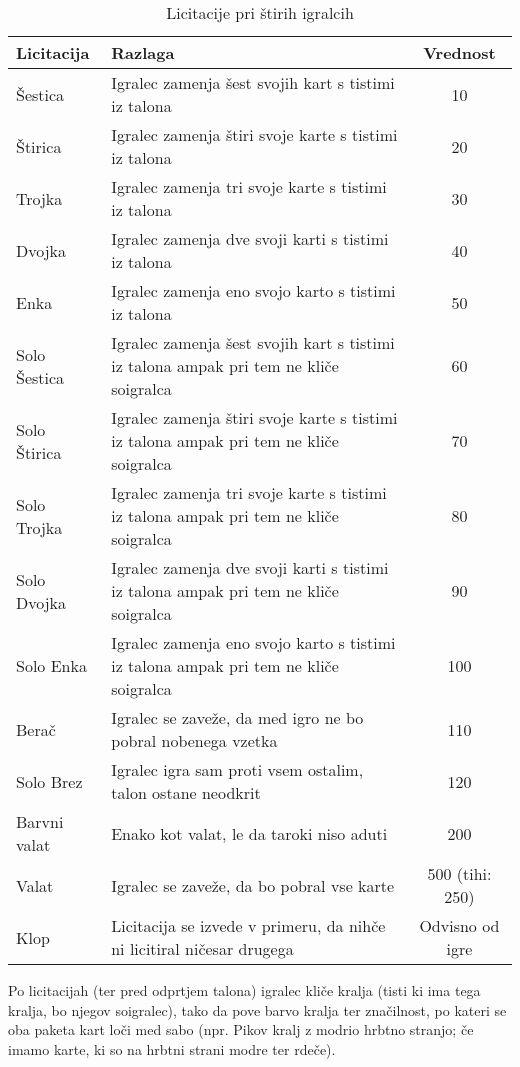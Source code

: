 \documentclass[a4paper, ]{report}
\begin{document}
\begin{table}
  \caption{Licitacije pri štirih igralcih}
  \begin{tabularx}{\textwidth}{lXc}
    \hline \hline
    \textbf{Licitacija} & \textbf{Razlaga} & \textbf{Vrednost} \\ \hline \hline
    Šestica & Igralec zamenja šest svojih kart s tistimi iz talona & 10 \\
    Štirica & Igralec zamenja štiri svoje karte s tistimi iz talona & 20 \\
    Trojka & Igralec zamenja tri svoje karte s tistimi iz talona & 30 \\
    Dvojka & Igralec zamenja dve svoji karti s tistimi iz talona & 40 \\
    Enka & Igralec zamenja eno svojo karto s tistimi iz talona & 50 \\
    Solo Šestica & Igralec zamenja šest svojih kart s tistimi iz talona ampak pri tem ne kliče soigralca & 60 \\
    Solo Štirica & Igralec zamenja štiri svoje karte s tistimi iz talona ampak pri tem ne kliče soigralca & 70 \\
    Solo Trojka & Igralec zamenja tri svoje karte s tistimi iz talona ampak pri tem ne kliče soigralca & 80 \\
    Solo Dvojka & Igralec zamenja dve svoji karti s tistimi iz talona ampak pri tem ne kliče soigralca & 90 \\
    Solo Enka & Igralec zamenja eno svojo karto s tistimi iz talona ampak pri tem ne kliče soigralca & 100 \\
    Berač & Igralec se zaveže, da med igro ne bo pobral nobenega vzetka & 110 \\
    Solo Brez & Igralec igra sam proti vsem ostalim, talon ostane neodkrit & 120 \\
    Barvni valat & Enako kot valat, le da taroki niso aduti & 200 \\
    Valat & Igralec se zaveže, da bo pobral vse karte & 500 (tihi: 250)\\
    Klop & Licitacija se izvede v primeru, da nihče ni licitiral ničesar drugega & Odvisno od igre \\ \hline \hline
  \end{tabularx}
\end{table}

Po licitacijah (ter pred odprtjem talona) igralec kliče kralja (tisti ki ima tega kralja, bo njegov soigralec), tako da pove barvo kralja ter značilnost, po kateri se oba paketa kart loči med sabo (npr. Pikov kralj z modrio hrbtno stranjo; če imamo karte, ki so na hrbtni strani modre ter rdeče).
\end{document}
